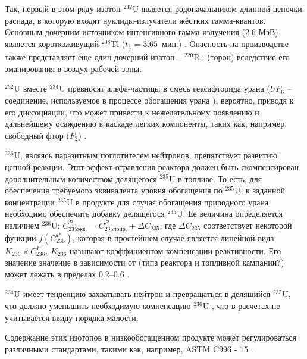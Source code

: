Так, первый в этом ряду изотоп $^{232}$U является родоначальником длинной цепочки распада, в которую входят нуклиды-излучатели жёстких гамма-квантов.
Основным дочерним источником интенсивного гамма-излучения (2.6 МэВ) является короткоживущий $^{208}$Tl ($t_{\frac{1}{2}}=3.65$ мин.) \cite{matveevUran232EgoVliyanie1985,abbasProliferationResistanceFeatures2013}. Опасность на производстве также представляет еще один дочерний изотоп -- $^{220}$Rn (торон) вследствие его эманирования в воздух рабочей зоны.

$^{232}$U вместе $^{234}$U превносят альфа-частицы в смесь гексафторида урана ($UF_6$ -- соединение, используемое в процессе обогащения урана \cite{orlovWayObtainUranium2015, orlovDesublimationPurificationTransporting2017}), вероятно, приводя к его диссоциации, что может привести к нежелательному появлению и дальнейшему осаждению в каскаде легких компоненты, таких как, например свободный фтор ($F_2$) \cite{kryuchkovObogashchennyyUranDobavleniem2007, bernhardtRadiationEffectsAlpha1958, shmelevRazrabotkaRaschetnoyModeli2012}.

$^{236}$U, являясь паразитным поглотителем нейтронов, препятствует развитию цепной реакции.
Этот эффект отравления реактора должен быть скомпенсирован дополнительным количеством делящегося $^{235}$U в топливе.
То есть, для обеспечения требуемого эквивалента уровня обогащения по $^{235}$U, к заданной концентрации $^{235}$U в продукте для случая обогащения природного урана необходимо обеспечить добавку делящегося $^{235}$U.
Ее величина определяется наличием $^{236}$U:
$C_{235 экв.}^{P}=C_{235 прир.}^{P}+\Delta C_{235}$, где $\Delta C_{235}$ соответствует некоторой функции $f\left(C_{236}^{P}\right)$, которая в простейшем случае является линейной вида $K_{236} \times C_{236}^{P}$. $K_{236}$ называют коэффициентом компенсации реактивности. Его значение значение в зависимости от (типа реактора и топливной кампании?) может лежать в пределах 0.2--0.6 \cite{delagarzaMulticomponentIsotopeSeparation1961, delculAnalysisReuseUranium2009}. 

$^{234}$U имеет тенденцию захватывать нейтрон и превращаться в делящийся $^{235}$U, что должно уменьшить необходимую компенсацию $^{236}$U \cite{dyachenkoIspolzovanieRegenerirovannogoUrana2012}, что в расчетах не учитывается ввиду порядка малости.

Содержание этих изотопов в низкообогащенном продукте может регулироваться различными стандартами, такими как, например, ASTM C996 - 15 \cite{c26committeeSpecificationUraniumHexafluoride}.

